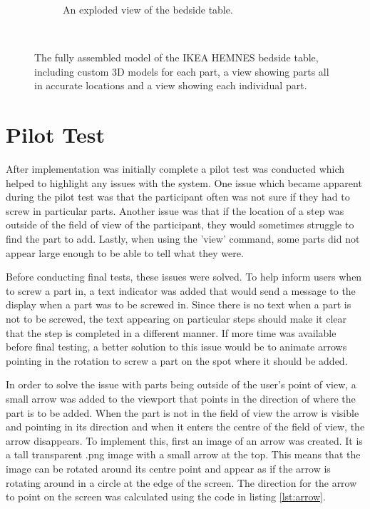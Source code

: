 \documentclass{l4proj}
\begin{document}
\begin{figure}[hbt!]
\begin{subfigure}[b]{0.45\textwidth}
        \caption{An exploded view of the bedside table.}
        \label{fig:syn2}
    \end{subfigure}
    ~ %
    \caption{The fully assembled model of the IKEA HEMNES bedside table, including custom 3D models for each part, a view showing parts all in accurate locations and a view showing each individual part.}
    \label{fig:explode}
\end{figure}


\section{Pilot Test}

After implementation was initially complete a pilot test was conducted which helped to highlight any issues with the system. One issue which became apparent during the pilot test was that the participant often was not sure if they had to screw in particular parts. Another issue was that if the location of a step was outside of the field of view of the participant, they would sometimes struggle to find the part to add. Lastly, when using the 'view' command, some parts did not appear large enough to be able to tell what they were.

Before conducting final tests, these issues were solved. To help inform users when to screw a part in, a text indicator was added that would send a message to the display when a part was to be screwed in. Since there is no text when a part is not to be screwed, the text appearing on particular steps should make it clear that the step is completed in a different manner. If more time was available before final testing, a better solution to this issue would be to animate arrows pointing in the rotation to screw a part on the spot where it should be added.

In order to solve the issue with parts being outside of the user's point of view, a small arrow was added to the viewport that points in the direction of where the part is to be added. When the part is not in the field of view the arrow is visible and pointing in its direction and when it enters the centre of the field of view, the arrow disappears. To implement this, first an image of an arrow was created. It is a tall transparent .png image with a small arrow at the top. This means that the image can be rotated around its centre point and appear as if the arrow is rotating around in a circle at the edge of the screen. The direction for the arrow to point on the screen was calculated using the code in listing \ref{lst:arrow}.
\end{document}
